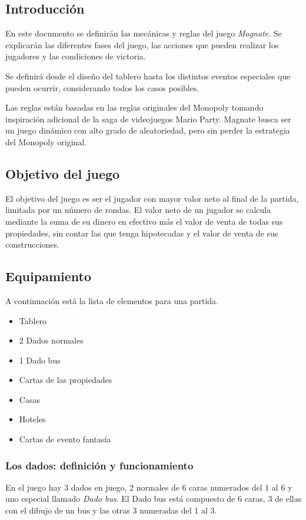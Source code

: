 \subsection{Introducción}
En este documento se definirán las mecánicas y reglas del juego \textit{Magnate}.
Se explicarán las diferentes fases del juego, las acciones que pueden realizar 
los jugadores y las condiciones de victoria. 

Se definirá desde el diseño del tablero hasta los distintos eventos especiales
que pueden ocurrir, considerando todos los casos posibles.

Las reglas están basadas en las reglas originales del Monopoly \cite{hasbro_monopoly_es} 
tomando inspiración adicional de la saga de videojuegos Mario Party.
Magnate busca ser un juego dinámico con alto grado de aleatoriedad, pero
sin perder la estrategia del Monopoly original.

\subsection{Objetivo del juego}
El objetivo del juego es ser el jugador con mayor valor neto al final de la
partida, limitada por un número de rondas. El valor neto de un jugador se calcula
mediante la suma de su dinero en efectivo más el valor de venta
de todas sus propiedades, sin contar las que tenga hipotecadas y
el valor de venta de sus construcciones.



\subsection{Equipamiento}
A continuación está la lista de elementos para una partida.
\begin{itemize}
	\item Tablero
	\item 2 Dados normales
	\item 1 Dado bus 
	\item Cartas de las propiedades 
	\item Casas
	\item Hoteles 
	\item Cartas de evento fantasía
\end{itemize}

\subsubsection{Los dados: definición y funcionamiento}
En el juego hay 3 dados en juego, 2 normales de 6 caras numerados del 1 al 
6 y uno especial llamado \textit{Dado bus}. El Dado bus está compuesto de 6
caras, 3 de ellas con el dibujo de un bus y las otras 3 numeradas del 1 al 3.

